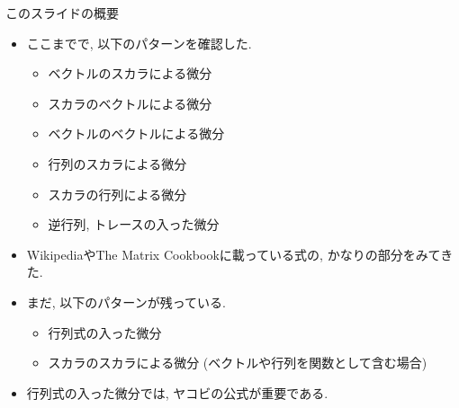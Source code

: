 \documentclass[dvipdfmx,notheorems,t]{beamer}
\begin{document}
\begin{frame}{このスライドの概要}
\begin{itemize}
  \item ここまでで, 以下のパターンを確認した.
  \begin{itemize}
    \item ベクトルのスカラによる微分
    \item スカラのベクトルによる微分
    \item ベクトルのベクトルによる微分
    \item 行列のスカラによる微分
    \item スカラの行列による微分
    \item 逆行列, トレースの入った微分
  \end{itemize}
  \item WikipediaやThe Matrix Cookbookに載っている式の, かなりの部分をみてきた.
  \item まだ, 以下のパターンが残っている.
  \begin{itemize}
    \item 行列式の入った微分
    \item スカラのスカラによる微分 (ベクトルや行列を関数として含む場合)
  \end{itemize}
  \item 行列式の入った微分では, ヤコビの公式が重要である.
\end{itemize}
\end{frame}
\end{document}
